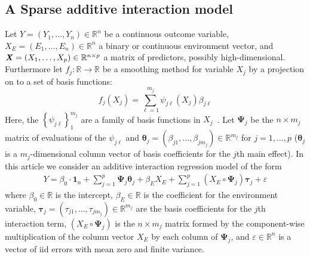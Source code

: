 \documentclass[12pt,letter]{article}\usepackage[]{graphicx}\usepackage[]{color}
\newcommand{\bX}{\textbf{\emph{X}}}
\newcommand{\btau}{\boldsymbol{\tau}}
\newcommand{\e}{{\mathsf E}}
\newcommand{\bmu}{\boldsymbol{\mu}}
\newcommand{\btheta}{\boldsymbol{\theta}}
\newcommand{\bPsi}{\boldsymbol{\Psi}}
\begin{document}
\subsection{A Sparse additive interaction model}
Let $Y=(Y_1, \ldots, Y_n) \in \mathbb{R}^n$ be a continuous outcome variable, \mbox{$X_E=(E_1, \ldots, E_n) \in \mathbb{R}^n$} a binary or continuous environment vector, and \mbox{$\bX = (X_{1}, \ldots, X_{p}) \in \mathbb{R}^{n\times p}$} a matrix of predictors, possibly high-dimensional. Furthermore let $f_j: \mathbb{R} \rightarrow \mathbb{R}$ be a smoothing method for variable $X_j$ by a projection on to a set of basis functions:
\begin{equation}
	f_j(X_j) = \sum_{\ell = 1}^{m_j} \psi_{j\ell}(X_j) \beta_{j\ell} \label{eq:smooth}
\end{equation}
Here, the $\left\lbrace \psi_{j\ell} \right\rbrace_1^{m_j}$ are a family of basis functions in $X_j$~\citep{hastie2015statistical}. Let $\bPsi_j$ be the $n \times m_j$ matrix of evaluations of the $\psi_{j\ell}$ and \mbox{$\btheta_j = (\beta_{j1}, \ldots, \beta_{jm_j}) \in \mathbb{R}^{m_j}$} for $j = 1, \ldots, p$ ($\btheta_j$ is a $m_j$-dimensional column vector of basis coefficients for the $j$th main effect). In this article we consider an additive interaction regression model of the form
\begin{align}
Y = \beta_0 \cdot \boldsymbol{1}_n + \sum_{j=1}^p \bPsi_j \btheta_j + \beta_E X_E + \sum_{j=1}^p (X_E \circ \bPsi_j) \btau_j + \varepsilon  \label{eq:linpred}
\end{align}
where $\beta_0 \in \mathbb{R}$ is the intercept, $\beta_E \in \mathbb{R}$ is the coefficient for the environment variable, $\btau_j = (\tau_{j1}, \ldots, \tau_{jm_j})\in \mathbb{R}^{m_j}$ are the basis coefficients for the $j$th interaction term, $(X_E \circ \bPsi_j)$ is the $n \times m_j$ matrix formed by the component-wise multiplication of the column vector $X_E$ by each column of $\bPsi_j$, and $\varepsilon \in \mathbb{R}^n$ is a vector of iid errors with mean zero and finite variance. %
\end{document}
